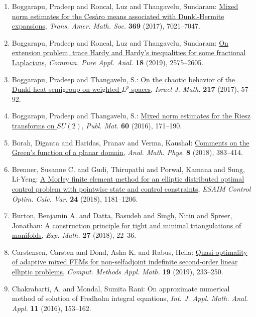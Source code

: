 \begin{enumerate}
\item Boggarapu, Pradeep and Roncal, Luz and Thangavelu, Sundaram: \href{https://doi.org/10.1090/tran/6861}{Mixed norm estimates for the {C}es\`aro means associated with
{D}unkl-{H}ermite expansions}, \emph{Trans. Amer. Math. Soc.} {\bf 369} (2017), 7021--7047.
\item Boggarapu, Pradeep and Roncal, Luz and Thangavelu, Sundaram: \href{https://doi.org/10.3934/cpaa.2019116}{On extension problem, trace {H}ardy and {H}ardy's inequalities
for some fractional {L}aplacians}, \emph{Commun. Pure Appl. Anal.} {\bf 18} (2019), 2575--2605.
\item Boggarapu, Pradeep and Thangavelu, S.: \href{https://doi.org/10.1007/s11856-017-1438-6}{On the chaotic behavior of the {D}unkl heat semigroup on
weighted {$L^p$} spaces}, \emph{Israel J. Math.} {\bf 217} (2017), 57--92.
\item Boggarapu, Pradeep and Thangavelu, S.: \href{http://projecteuclid.org/euclid.pm/1450818486}{Mixed norm estimates for the {R}iesz transforms on {$SU(2)$}}, \emph{Publ. Mat.} {\bf 60} (2016), 171--190.
\item Borah, Diganta and Haridas, Pranav and Verma, Kaushal: \href{https://doi.org/10.1007/s13324-017-0177-5}{Comments on the {G}reen's function of a planar domain}, \emph{Anal. Math. Phys.} {\bf 8} (2018), 383--414.
\item Brenner, Susanne C. and Gudi, Thirupathi and Porwal, Kamana
and Sung, Li-Yeng: \href{https://doi.org/10.1051/cocv/2017031}{A {M}orley finite element method for an elliptic distributed
optimal control problem with pointwise state and control
constraints}, \emph{ESAIM Control Optim. Calc. Var.} {\bf 24} (2018), 1181--1206.
\item Burton, Benjamin A. and Datta, Basudeb and Singh, Nitin and
Spreer, Jonathan: \href{https://doi.org/10.1080/10586458.2016.1212747}{A construction principle for tight and minimal triangulations
of manifolds}, \emph{Exp. Math.} {\bf 27} (2018), 22--36.
\item Carstensen, Carsten and Dond, Asha K. and Rabus, Hella: \href{https://doi.org/10.1515/cmam-2019-0034}{Quasi-optimality of adaptive mixed {FEM}s for non-selfadjoint
indefinite second-order linear elliptic problems}, \emph{Comput. Methods Appl. Math.} {\bf 19} (2019), 233--250.
\item Chakrabarti, A. and Mondal, Sumita Rani: On approximate numerical method of solution of {F}redholm
integral equations, \emph{Int. J. Appl. Math. Anal. Appl.} {\bf 11} (2016), 153--162.

\end{enumerate}
